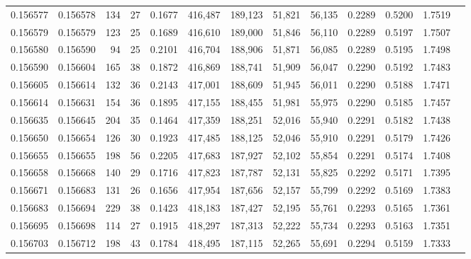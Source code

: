 \begin{tabular}{rrrrrrrrrrrrr}
0.156577 & 0.156578 &   134 &  27 &                                     0.1677 & 416,487 & 189,123 &  51,821 &  56,135 & 0.2289 & 0.5200 & 1.7519 \\
0.156579 & 0.156579 &   123 &  25 &                                     0.1689 & 416,610 & 189,000 &  51,846 &  56,110 & 0.2289 & 0.5197 & 1.7507 \\
0.156580 & 0.156590 &    94 &  25 &                                     0.2101 & 416,704 & 188,906 &  51,871 &  56,085 & 0.2289 & 0.5195 & 1.7498 \\
0.156590 & 0.156604 &   165 &  38 &                                     0.1872 & 416,869 & 188,741 &  51,909 &  56,047 & 0.2290 & 0.5192 & 1.7483 \\
0.156605 & 0.156614 &   132 &  36 &                                     0.2143 & 417,001 & 188,609 &  51,945 &  56,011 & 0.2290 & 0.5188 & 1.7471 \\
0.156614 & 0.156631 &   154 &  36 &                                     0.1895 & 417,155 & 188,455 &  51,981 &  55,975 & 0.2290 & 0.5185 & 1.7457 \\
0.156635 & 0.156645 &   204 &  35 &                                     0.1464 & 417,359 & 188,251 &  52,016 &  55,940 & 0.2291 & 0.5182 & 1.7438 \\
0.156650 & 0.156654 &   126 &  30 &                                     0.1923 & 417,485 & 188,125 &  52,046 &  55,910 & 0.2291 & 0.5179 & 1.7426 \\
0.156655 & 0.156655 &   198 &  56 &                                     0.2205 & 417,683 & 187,927 &  52,102 &  55,854 & 0.2291 & 0.5174 & 1.7408 \\
0.156658 & 0.156668 &   140 &  29 &                                     0.1716 & 417,823 & 187,787 &  52,131 &  55,825 & 0.2292 & 0.5171 & 1.7395 \\
0.156671 & 0.156683 &   131 &  26 &                                     0.1656 & 417,954 & 187,656 &  52,157 &  55,799 & 0.2292 & 0.5169 & 1.7383 \\
0.156683 & 0.156694 &   229 &  38 &                                     0.1423 & 418,183 & 187,427 &  52,195 &  55,761 & 0.2293 & 0.5165 & 1.7361 \\
0.156695 & 0.156698 &   114 &  27 &                                     0.1915 & 418,297 & 187,313 &  52,222 &  55,734 & 0.2293 & 0.5163 & 1.7351 \\
0.156703 & 0.156712 &   198 &  43 &                                     0.1784 & 418,495 & 187,115 &  52,265 &  55,691 & 0.2294 & 0.5159 & 1.7333 \\

\end{tabular}
